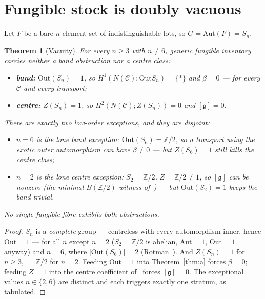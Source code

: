 \documentclass[11pt]{article}
\newtheorem{theorem}{Theorem}
\theoremstyle{definition}
\newcommand{\C}{\mathcal{C}}
\newcommand{\Z}{\mathbb{Z}}
\newcommand{\Aut}{\mathrm{Aut}}
\newcommand{\Out}{\mathrm{Out}}
\newcommand{\gerbe}{\mathfrak{g}}
\begin{document}
\section{Fungible stock is doubly vacuous}\label{sec:b}

Let $F$ be a bare $n$-element set of indistinguishable lots, so $G=\Aut(F)=S_n$.

\begin{theorem}[Vacuity]\label{thm:b}
For every $n\ge 3$ with $n\neq 6$, generic fungible inventory carries neither a band obstruction nor a
centre class:
\begin{itemize}
\item \textbf{band:} $\Out(S_n)=1$, so $H^1(N(\C);\Out S_n)=\{*\}$ and $\beta=0$ --- for every $\C$ and
every transport;
\item \textbf{centre:} $Z(S_n)=1$, so $H^2(N(\C);Z(S_n))=0$ and $[\gerbe]=0$.
\end{itemize}
There are exactly two low-order exceptions, and they are \emph{disjoint}:
\begin{itemize}
\item $n=6$ is the lone band exception: $\Out(S_6)=\Z/2$, so a transport using the exotic outer
automorphism can have $\beta\neq0$ --- but $Z(S_6)=1$ still kills the centre class;
\item $n=2$ is the lone centre exception: $S_2=\Z/2$, $Z=\Z/2\neq1$, so $[\gerbe]$ can be nonzero (the
minimal $B(\Z/2)$ witness of~\cite{gerbenote}) --- but $\Out(S_2)=1$ keeps the band trivial.
\end{itemize}
No single fungible fibre exhibits both obstructions.
\end{theorem}

\begin{proof}
$S_n$ is a \emph{complete} group --- centreless with every automorphism inner, hence $\Out=1$ --- for
all $n$ except $n=2$ ($S_2=\Z/2$ is abelian, $\Aut=1$, $\Out=1$ anyway) and $n=6$, where
$|\Out(S_6)|=2$ (Rotman~\cite[Thms.\ 7.5--7.7]{rotman}). And $Z(S_n)=1$ for $n\ge3$, $=\Z/2$ for
$n=2$. Feeding $\Out=1$ into Theorem~\ref{thm:a} forces $\beta=0$; feeding $Z=1$ into the centre
coefficient of~\cite{gerbenote} forces $[\gerbe]=0$. The exceptional values $n\in\{2,6\}$ are distinct
and each triggers exactly one stratum, as tabulated.
\end{proof}
\end{document}
